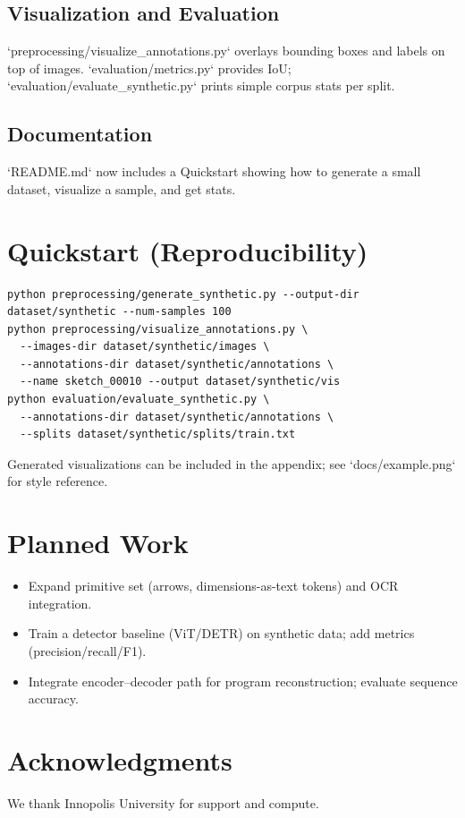 \documentclass[11pt,a4paper]{article}
\begin{document}
\subsection{Visualization and Evaluation}
`preprocessing/visualize_annotations.py` overlays bounding boxes and labels on top of images. `evaluation/metrics.py` provides IoU; `evaluation/evaluate_synthetic.py` prints simple corpus stats per split.

\subsection{Documentation}
`README.md` now includes a Quickstart showing how to generate a small dataset, visualize a sample, and get stats.

\section{Quickstart (Reproducibility)}
\begin{verbatim}
python preprocessing/generate_synthetic.py --output-dir dataset/synthetic --num-samples 100
python preprocessing/visualize_annotations.py \
  --images-dir dataset/synthetic/images \
  --annotations-dir dataset/synthetic/annotations \
  --name sketch_00010 --output dataset/synthetic/vis
python evaluation/evaluate_synthetic.py \
  --annotations-dir dataset/synthetic/annotations \
  --splits dataset/synthetic/splits/train.txt
\end{verbatim}

Generated visualizations can be included in the appendix; see `docs/example.png` for style reference.

\section{Planned Work}
\begin{itemize}[leftmargin=*]
  \item Expand primitive set (arrows, dimensions-as-text tokens) and OCR integration.
  \item Train a detector baseline (ViT/DETR) on synthetic data; add metrics (precision/recall/F1).
  \item Integrate encoder--decoder path for program reconstruction; evaluate sequence accuracy.
\end{itemize}

\section*{Acknowledgments}
We thank Innopolis University for support and compute.
\end{document}
